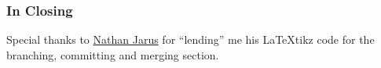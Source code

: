 \documentclass{beamer}
\newcounter{branching}
\newcounter{committing}
\newcounter{merging}
\begin{document}
\begin{frame}
    \frametitle{In Closing}
    Special thanks to \href{http://web.mst.edu/~nmjxv3/}{Nathan Jarus} for ``lending'' me his \LaTeX tikz code for the branching, committing and merging section.

\end{frame}
\end{document}

